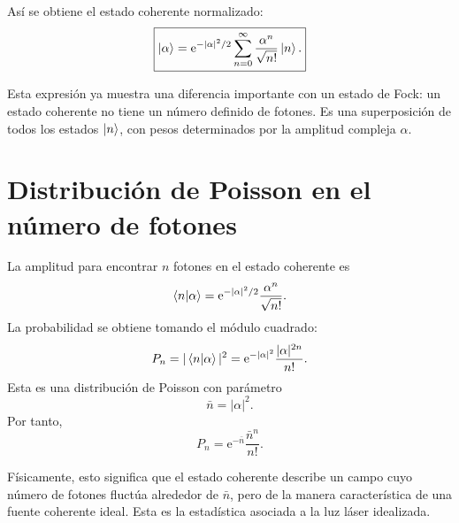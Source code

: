\documentclass[11pt]{article}
\newcommand{\ee}{\mathrm{e}}
\begin{document}
As\'i se obtiene el estado coherente normalizado:
\begin{equation}
  \boxed{
  \ket{\alpha}
  =\ee^{-|\alpha|^2/2}
   \sum_{n=0}^{\infty}\frac{\alpha^n}{\sqrt{n!}}\ket{n}.
  }
\end{equation}

Esta expresi\'on ya muestra una diferencia importante con un estado de Fock:
un estado coherente no tiene un n\'umero definido de fotones. Es una
superposici\'on de todos los estados $\ket n$, con pesos determinados por la
amplitud compleja $\alpha$.

\section{Distribuci\'on de Poisson en el n\'umero de fotones}

La amplitud para encontrar $n$ fotones en el estado coherente es
\begin{equation}
  \braket{n|\alpha}
  =\ee^{-|\alpha|^2/2}\frac{\alpha^n}{\sqrt{n!}}.
\end{equation}
La probabilidad se obtiene tomando el m\'odulo cuadrado:
\begin{equation}
  P_n
  =|\braket{n|\alpha}|^2
  =\ee^{-|\alpha|^2}\frac{|\alpha|^{2n}}{n!}.
\end{equation}
Esta es una distribuci\'on de Poisson con par\'ametro
\begin{equation}
  \bar n=|\alpha|^2.
\end{equation}
Por tanto,
\begin{equation}
  P_n=\ee^{-\bar n}\frac{\bar n^n}{n!}.
\end{equation}

F\'isicamente, esto significa que el estado coherente describe un campo cuyo
n\'umero de fotones fluct\'ua alrededor de $\bar n$, pero de la manera
caracter\'istica de una fuente coherente ideal. Esta es la estad\'istica
asociada a la luz l\'aser idealizada.
\end{document}
